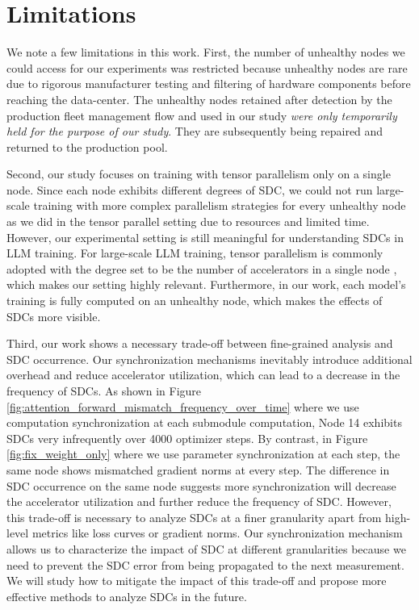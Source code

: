 \section{Limitations}
We note a few limitations in this work. First, the number of unhealthy nodes we could access for our experiments was restricted because unhealthy nodes are rare due to rigorous manufacturer testing and filtering of hardware components before reaching the data-center.
The unhealthy nodes retained after detection by the production fleet management flow and used in our study \emph{were only temporarily held for the purpose of our study}. They are subsequently being repaired and returned to the production pool.

Second, our study focuses on training with tensor parallelism only on a single node. Since each node exhibits different degrees of SDC, we could not run large-scale training with more complex parallelism strategies for every unhealthy node as we did in the tensor parallel setting due to resources and limited time. However, our experimental setting is still meaningful for understanding SDCs in LLM training. For large-scale LLM training, tensor parallelism is commonly adopted with the degree set to be the number of accelerators in a single node \cite{narayanan2021efficient}, which makes our setting highly relevant. Furthermore, in our work, each model’s training is fully computed on an unhealthy node, which makes the effects of SDCs more visible.

Third, our work shows a necessary trade-off between fine-grained analysis and SDC occurrence. Our synchronization mechanisms inevitably introduce additional overhead and reduce accelerator utilization, which can lead to a decrease in the frequency of SDCs. As shown in Figure \ref{fig:attention_forward_mismatch_frequency_over_time} where we use computation synchronization at each submodule computation, Node 14 exhibits SDCs very infrequently over 4000 optimizer steps. By contrast, in Figure \ref{fig:fix_weight_only} where we use parameter synchronization at each step, the same node shows mismatched gradient norms at every step. The difference in SDC occurrence on the same node suggests more synchronization will decrease the accelerator utilization and further reduce the frequency of SDC. 
However, this trade-off is necessary to analyze SDCs at a finer granularity apart from high-level metrics like loss curves or gradient norms. Our synchronization mechanism allows us to characterize the impact of SDC at different granularities because we need to prevent the SDC error from being propagated to the next measurement. We will study how to mitigate the impact of this trade-off and propose more effective methods to analyze SDCs in the future.

